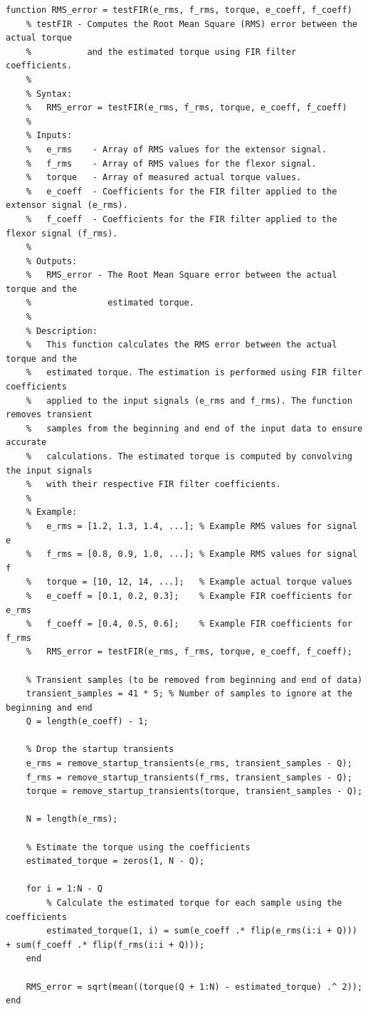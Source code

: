 \documentclass[12pt]{article}
\begin{document}
\begin{lstlisting}[caption={testFIR.m}]
 function RMS_error = testFIR(e_rms, f_rms, torque, e_coeff, f_coeff)
    % testFIR - Computes the Root Mean Square (RMS) error between the actual torque
    %           and the estimated torque using FIR filter coefficients.
    %
    % Syntax:
    %   RMS_error = testFIR(e_rms, f_rms, torque, e_coeff, f_coeff)
    %
    % Inputs:
    %   e_rms    - Array of RMS values for the extensor signal.
    %   f_rms    - Array of RMS values for the flexor signal.
    %   torque   - Array of measured actual torque values.
    %   e_coeff  - Coefficients for the FIR filter applied to the extensor signal (e_rms).
    %   f_coeff  - Coefficients for the FIR filter applied to the flexor signal (f_rms).
    %
    % Outputs:
    %   RMS_error - The Root Mean Square error between the actual torque and the
    %               estimated torque.
    %
    % Description:
    %   This function calculates the RMS error between the actual torque and the
    %   estimated torque. The estimation is performed using FIR filter coefficients
    %   applied to the input signals (e_rms and f_rms). The function removes transient
    %   samples from the beginning and end of the input data to ensure accurate
    %   calculations. The estimated torque is computed by convolving the input signals
    %   with their respective FIR filter coefficients.
    %
    % Example:
    %   e_rms = [1.2, 1.3, 1.4, ...]; % Example RMS values for signal e
    %   f_rms = [0.8, 0.9, 1.0, ...]; % Example RMS values for signal f
    %   torque = [10, 12, 14, ...];   % Example actual torque values
    %   e_coeff = [0.1, 0.2, 0.3];    % Example FIR coefficients for e_rms
    %   f_coeff = [0.4, 0.5, 0.6];    % Example FIR coefficients for f_rms
    %   RMS_error = testFIR(e_rms, f_rms, torque, e_coeff, f_coeff);

    % Transient samples (to be removed from beginning and end of data)
    transient_samples = 41 * 5; % Number of samples to ignore at the beginning and end
    Q = length(e_coeff) - 1;

    % Drop the startup transients
    e_rms = remove_startup_transients(e_rms, transient_samples - Q);
    f_rms = remove_startup_transients(f_rms, transient_samples - Q);
    torque = remove_startup_transients(torque, transient_samples - Q);

    N = length(e_rms);

    % Estimate the torque using the coefficients
    estimated_torque = zeros(1, N - Q);

    for i = 1:N - Q
        % Calculate the estimated torque for each sample using the coefficients
        estimated_torque(1, i) = sum(e_coeff .* flip(e_rms(i:i + Q))) + sum(f_coeff .* flip(f_rms(i:i + Q)));
    end

    RMS_error = sqrt(mean((torque(Q + 1:N) - estimated_torque) .^ 2));
end
\end{lstlisting}
\end{document}
